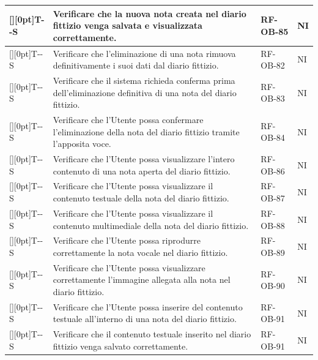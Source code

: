 \documentclass[a4paper,12pt]{article}
\newcounter{testsys}
\newcommand{\systestcode}{%
  \raisebox{0pt}[\height][0pt]{\hypertarget{T-\arabic{testsys}-S}{}}T-\arabic{testsys}-S%
}
\begin{document}
\begin{longtable}{| >{\centering\arraybackslash}p{} | >{\raggedright\arraybackslash}p{} | >{\centering\arraybackslash}p{} | >{\centering\arraybackslash}p{} |}
\stepcounter{testsys} \systestcode & Verificare che la nuova nota creata nel diario fittizio venga salvata e visualizzata correttamente. & RF-OB-85 & NI \\
\hline

\stepcounter{testsys} \systestcode & Verificare che l'eliminazione di una nota rimuova definitivamente i suoi dati dal diario fittizio. & RF-OB-82 & NI \\
\hline

\stepcounter{testsys} \systestcode & Verificare che il sistema richieda conferma prima dell'eliminazione definitiva di una nota del diario fittizio. & RF-OB-83 & NI \\
\hline

\stepcounter{testsys} \systestcode & Verificare che l'Utente possa confermare l'eliminazione della nota del diario fittizio tramite l'apposita voce. & RF-OB-84 & NI \\
\hline

\stepcounter{testsys} \systestcode & Verificare che l'Utente possa visualizzare l'intero contenuto di una nota aperta del diario fittizio. & RF-OB-86 & NI \\
\hline

\stepcounter{testsys} \systestcode & Verificare che l'Utente possa visualizzare il contenuto testuale della nota del diario fittizio. & RF-OB-87 & NI \\
\hline

\stepcounter{testsys} \systestcode & Verificare che l'Utente possa visualizzare il contenuto multimediale della nota del diario fittizio. & RF-OB-88 & NI \\
\hline

\stepcounter{testsys} \systestcode & Verificare che l'Utente possa riprodurre correttamente la nota vocale nel diario fittizio. & RF-OB-89 & NI \\
\hline

\stepcounter{testsys} \systestcode & Verificare che l'Utente possa visualizzare correttamente l'immagine allegata alla nota nel diario fittizio. & RF-OB-90 & NI \\
\hline

\stepcounter{testsys} \systestcode & Verificare che l'Utente possa inserire del contenuto testuale all'interno di una nota del diario fittizio. & RF-OB-91 & NI \\
\hline

\stepcounter{testsys} \systestcode & Verificare che il contenuto testuale inserito nel diario fittizio venga salvato correttamente. & RF-OB-91 & NI \\
\hline


\end{longtable}
\end{document}
